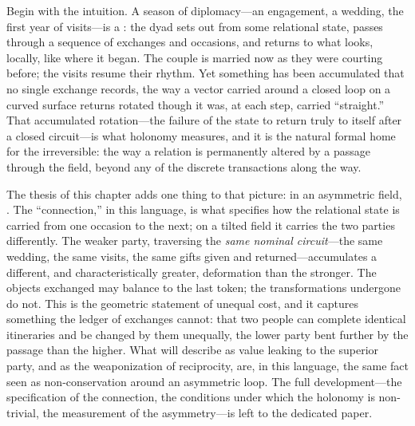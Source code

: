 Begin with the intuition. A season of diplomacy---an engagement, a wedding, the first year of visits---is a : the dyad sets out from some relational state, passes through a sequence of exchanges and occasions, and returns to what looks, locally, like where it began. The couple is married now as they were courting before; the visits resume their rhythm. Yet something has been accumulated that no single exchange records, the way a vector carried around a closed loop on a curved surface returns rotated though it was, at each step, carried ``straight.'' That accumulated rotation---the failure of the state to return truly to itself after a closed circuit---is what holonomy measures, and it is the natural formal home for the irreversible: the way a relation is permanently altered by a passage through the field, beyond any of the discrete transactions along the way.

The thesis of this chapter adds one thing to that picture: in an asymmetric field, . The ``connection,'' in this language, is what specifies how the relational state is carried from one occasion to the next; on a tilted field it carries the two parties differently. The weaker party, traversing the \emph{same nominal circuit}---the same wedding, the same visits, the same gifts given and returned---accumulates a different, and characteristically greater, deformation than the stronger. The objects exchanged may balance to the last token; the transformations undergone do not. This is the geometric statement of unequal cost, and it captures something the ledger of exchanges cannot: that two people can complete identical itineraries and be changed by them unequally, the lower party bent further by the passage than the higher. What  will describe as value leaking to the superior party, and  as the weaponization of reciprocity, are, in this language, the same fact seen as non-conservation around an asymmetric loop. The full development---the specification of the connection, the conditions under which the holonomy is non-trivial, the measurement of the asymmetry---is left to the dedicated paper.

